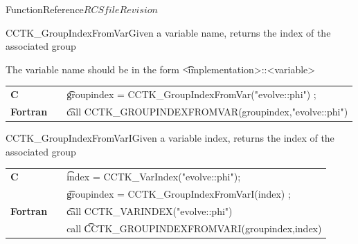 \begin{cactuspart}{FunctionReference}{$RCSfile$}{$Revision$}
\begin{CCTKFunc}{CCTK\_GroupIndexFromVar}{Given a variable name, returns the index of the associated group}
\label{CCTK-GroupIndexFromVar}
\showargs
\begin{params}
\end{params}
\begin{discussion}
The variable name should be in the form {\t <implementation>::<variable>}
\end{discussion}
\begin{examples}
\begin{tabular}{@{}p{3cm}cp{11cm}}
\hfill {\bf C} && {\t groupindex = CCTK\_GroupIndexFromVar("evolve::phi") ;}
\\
\hfill {\bf Fortran} && {\t call CCTK\_GROUPINDEXFROMVAR(groupindex,"evolve::phi")}
\\
\end{tabular}
\end{examples}
\begin{errorcodes}
\end{errorcodes}
\end{CCTKFunc}


\begin{CCTKFunc}{CCTK\_GroupIndexFromVarI}{Given a variable index, returns the index of the associated group}
\label{CCTK-GroupIndexFromVarI}
\showargs
\begin{params}
\end{params}
\begin{discussion}
\end{discussion}
\begin{examples}
\begin{tabular}{@{}p{3cm}cp{11cm}}
\hfill {\bf C} && {\t index = CCTK\_VarIndex("evolve::phi");} \\
               && {\t groupindex = CCTK\_GroupIndexFromVarI(index) ;}
\\
\hfill {\bf Fortran} && {\t call CCTK\_VARINDEX("evolve::phi")}\\
                     &&call {\t CCTK\_GROUPINDEXFROMVARI(groupindex,index)}
\\
\end{tabular}
\end{examples}
\begin{errorcodes}
\end{errorcodes}
\end{CCTKFunc}



\end{cactuspart}
